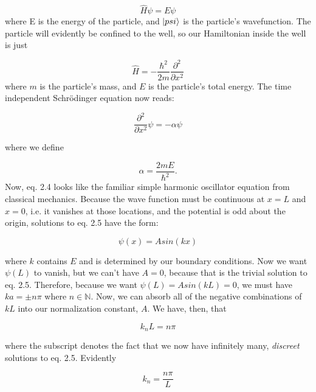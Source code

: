 \begin{equation}
\hat{H} \psi = E\psi
\end{equation}
where E is the energy of the particle, and $\ket{psi}$ is the particle's wavefunction. The particle will evidently be confined to the well, so our Hamiltonian inside the well is just

\begin{equation}
\hat{H} = - \frac{\hbar^2}{2m} \frac{\partial^2}{\partial x^2}
\label{hamil}
\end{equation}
where $m$ is the particle's mass, and $E$ is the particle's  total energy. The time independent Schr\"{o}dinger equation now reads:

\begin{equation} \label{tise}
\frac{\partial^2}{\partial x^2} \psi = - \alpha \psi
\end{equation}

where we define 

\begin{equation}
\alpha = \frac{2mE}{\hbar^2}.
\end{equation}
Now, eq. 2.4 looks like the familiar simple harmonic oscillator equation from classical mechanics. Because the wave function must be continuous at $x = L$ and $ x = 0$, i.e. it vanishes at those locations, and the potential is odd about the origin,  solutions to eq. 2.5 have the form:

\begin{equation} \label{soln1}
\psi(x) = A sin(k x) 
\end{equation}

where $k$ contains $E$ and is determined by our boundary conditions. Now we want $\psi(L)$ to vanish, but we can't have $A =0$, because that is the trivial solution to eq. 2.5. Therefore, because we want $\psi(L) = Asin(k L) = 0 $, we must have $ka = \pm n \pi$ where $n \in \mathbb{N}$. Now, we can absorb all of the negative combinations of $k L$ into our normalization constant, $A$. We have, then, that 

\begin{equation}
k_n L = n \pi 
\end{equation}

where the subscript denotes the fact that we now have infinitely many, \textit{discreet} solutions to eq. 2.5. Evidently 

\begin{equation}
k_n = \frac{ n \pi}{L}
\end{equation}

